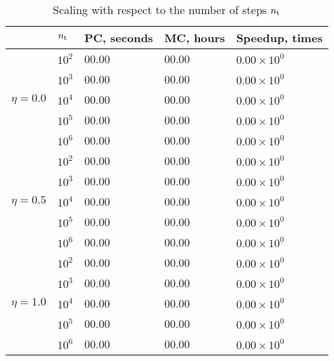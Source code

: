 \begin{table}[h]
  \vspace{-0.5em}
  \caption{Scaling with respect to the number of steps \textnormal{${n_\text{t}}$}}
  \vspace{-0.5em}
  \begin{tabular*}{1\linewidth}{cL{20pt}R{50pt}R{50pt}R{60pt}}
    \toprule
    & ${n_\text{t}}$ & PC, seconds & MC, hours & Speedup, times \\
    \midrule
    \midrule
    & $10^2$ & 00.00 & 00.00 & $0.00 \times 10^0$ \\
    & $10^3$ & 00.00 & 00.00 & $0.00 \times 10^0$ \\
    & $10^4$ & 00.00 & 00.00 & $0.00 \times 10^0$ \\
    & $10^5$ & 00.00 & 00.00 & $0.00 \times 10^0$ \\
    & $10^6$ & 00.00 & 00.00 & $0.00 \times 10^0$ \\
    \midrule
    & $10^2$ & 00.00 & 00.00 & $0.00 \times 10^0$ \\
    & $10^3$ & 00.00 & 00.00 & $0.00 \times 10^0$ \\
    & $10^4$ & 00.00 & 00.00 & $0.00 \times 10^0$ \\
    & $10^5$ & 00.00 & 00.00 & $0.00 \times 10^0$ \\
    & $10^6$ & 00.00 & 00.00 & $0.00 \times 10^0$ \\
    \midrule
    & $10^2$ & 00.00 & 00.00 & $0.00 \times 10^0$ \\
    & $10^3$ & 00.00 & 00.00 & $0.00 \times 10^0$ \\
    & $10^4$ & 00.00 & 00.00 & $0.00 \times 10^0$ \\
    & $10^5$ & 00.00 & 00.00 & $0.00 \times 10^0$ \\
    & $10^6$ & 00.00 & 00.00 & $0.00 \times 10^0$ \\
    \bottomrule
  \end{tabular*}
  \vspace{-0.5em}
\end{table}
